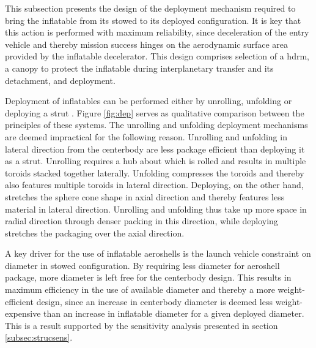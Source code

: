 This subsection presents the design of the deployment mechanism required to bring the inflatable from its stowed to its deployed configuration. It is key that this action is performed with maximum reliability, since deceleration of the entry vehicle and thereby mission success hinges on the aerodynamic surface area provided by the inflatable decelerator. This design comprises selection of a \acrfull{hdrm}, a canopy to protect the inflatable during interplanetary transfer and its detachment, and deployment.

Deployment of inflatables can be performed either by unrolling, unfolding or deploying a strut \cite[p.222-227]{Jenkins2001}. Figure \ref{fig:dep} serves as qualitative comparison between the principles of these systems. The unrolling and unfolding deployment mechanisms are deemed impractical for the following reason. Unrolling and unfolding in lateral direction from the centerbody are less package efficient than deploying it as a strut. Unrolling requires a hub about which is rolled and results in multiple toroids stacked together laterally. Unfolding compresses the toroids and thereby also features multiple toroids in lateral direction. Deploying, on the other hand, stretches the sphere cone shape in axial direction and thereby features less material in lateral direction. Unrolling and unfolding thus take up more space in radial direction through denser packing in this direction, while deploying stretches the packaging over the axial direction. 

A key driver for the use of inflatable aeroshells is the launch vehicle constraint on diameter in stowed configuration. By requiring less diameter for aeroshell package, more diameter is left free for the centerbody design. This results in maximum efficiency in the use of available diameter and thereby a more weight-efficient design, since an increase in centerbody diameter is deemed less weight-expensive than an increase in inflatable diameter for a given deployed diameter. This is a result supported by the sensitivity analysis presented in section \ref{subsec:strucsens}. 

